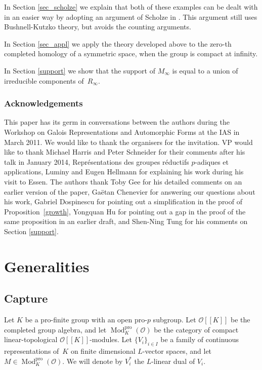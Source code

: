 \documentclass[11pt]{article}
\let\mathcal\mathscr
\theoremstyle{definition}
\DeclareMathOperator{\Mod}{Mod}
\newcommand{\br}[1]{[\![#1]\!]}
\newcommand{\cO}{\mathcal{O}}
\newcommand{\pro}{\mathrm{pro}}
\begin{document}
In Section \ref{sec_scholze} we explain that both of these examples can be dealt with in an easier way
by adopting an argument of Scholze in \cite{scholze}. This argument still uses Bushnell-Kutzko theory, but avoids the counting arguments.

In Section \ref{sec_appl} we apply the theory developed above to the zero-th completed homology of a symmetric space, when the group is compact at infinity.

In Section \ref{support} we show that the support of $M_{\infty}$ is equal to a union of irreducible components of~$R_\infty$.

\subsubsection*{Acknowledgements} This paper has its germ in conversations between the authors during the Workshop on Galois Representations and Automorphic Forms at the IAS in March 2011.
We would like to thank the organisers for the invitation. VP would like to thank Michael Harris and Peter Schneider for their
comments after his talk in January 2014, Représentations des groupes réductifs $p$-adiques et applications, Luminy and Eugen Hellmann for explaining his work during his visit to Essen. The authors thank Toby Gee for his detailed comments on an earlier version of the paper, Gaëtan Chenevier for answering our questions about his work,
Gabriel Dospinescu for pointing out a simplification in the proof of Proposition~\ref{growth},
Yongquan Hu for pointing out a gap in the proof of the same proposition
in an earlier draft,
and Shen-Ning Tung for his comments on Section \ref{support}.

\section{Generalities}\label{generalities}

\subsection{Capture}\label{sec_capture}
Let $K$ be a pro-finite group with an open pro-$p$ subgroup.
Let $\cO\br{K}$ be the completed group algebra, and
let $\Mod^{\pro}_K(\cO)$ be the category of compact linear-topological $\cO\br{K}$-modules. Let $\{V_i\}_{i\in I}$ be a family of
continuous representations
of~$K$ on finite dimensional $L$-vector spaces, and let $M\in \Mod^{\mathrm{pro}}_K(\cO)$. We will denote by $V_i^*$ the $L$-linear dual of $V_i$.
\end{document}
